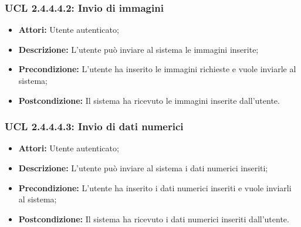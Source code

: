 \hypertarget{L2.4.4.4.2}{}
\subsubsection{UCL 2.4.4.4.2: Invio di immagini}
\begin{itemize}
\item \textbf{Attori:} Utente autenticato;
\item \textbf{Descrizione:} L'utente può inviare al sistema le immagini inserite;
\item \textbf{Precondizione:} L'utente ha inserito le immagini richieste e vuole inviarle al sistema;
\item \textbf{Postcondizione:} Il sistema ha ricevuto le immagini inserite dall'utente.
\end{itemize}

\hypertarget{L2.4.4.4.3}{}
\subsubsection{UCL 2.4.4.4.3: Invio di dati numerici}
\begin{itemize}
\item \textbf{Attori:} Utente autenticato;
\item \textbf{Descrizione:} L'utente può inviare al sistema i dati numerici inseriti;
\item \textbf{Precondizione:} L'utente ha inserito i dati numerici inseriti e vuole inviarli al sistema;
\item \textbf{Postcondizione:} Il sistema ha ricevuto i dati numerici inseriti dall'utente.
\end{itemize}

\hypertarget{L2.4.4.4.4}{}
